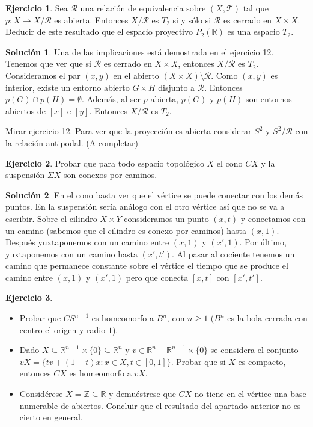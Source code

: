 \documentclass{article}
\theoremstyle{plain}
\theoremstyle{definition}
\newtheorem{exercise}{Ejercicio}
\newtheorem*{sol*}{Solución}
\begin{document}
\newpage
\begin{exercise}
Sea $\mathcal{R}$ una relación de equivalencia sobre $(X, \mathcal{T})$ tal que $p : X \to X/\mathcal{R}$ es abierta. Entonces $X/\mathcal{R}$ es $T_2$ si y sólo si $\mathcal{R}$ es cerrado en $X \times X$. Deducir de este resultado que el espacio proyectivo $P_2(\mathbb{R})$ es una espacio $T_2$.
\end{exercise}
\begin{sol*}
Una de las implicaciones está demostrada en el ejercicio 12. Tenemos que ver que si $\mathcal{R}$ es cerrado en $X \times X$, entonces $X / \mathcal{R}$ es $T_2$. Consideramos el par $(x,y)$ en el abierto $(X \times X) \setminus \mathcal{R}$. Como $(x,y)$ es interior, existe un entorno abierto $G \times H$ disjunto a $\mathcal{R}$. Entonces $p(G) \cap p(H) = \emptyset$. Además, al ser $p$ abierta, $p(G)$ y $p(H)$ son entornos abiertos de $[x]$ e $[y]$. Entonces $X/\mathcal{R}$ es $T_2$.  

Mirar ejercicio 12. Para ver que la proyección es abierta considerar $S^2$ y $S^2/\mathcal{R}$ con la relación antipodal. (A completar)
\end{sol*}


\newpage
\begin{exercise}
Probar que para todo espacio topológico $X$ el cono $C X$ y la suspensión $\Sigma X$ son conexos por caminos.
\end{exercise}
\begin{sol*}
En el cono basta ver que el vértice se puede conectar con los demás puntos. En la suspensión sería análogo con el otro vértice así que no se va a escribir. Sobre el cilindro $X\times Y$ consideramos un punto $(x,t)$ y conectamos con un camino (sabemos que el cilindro es conexo por caminos) hasta $(x,1)$. Después yuxtaponemos con un camino entre $(x,1)$ y $(x',1)$. Por último, yuxtaponemos con un camino hasta $(x',t')$. Al pasar al cociente tenemos un camino que permanece constante sobre el vértice el tiempo que se produce el camino entre $(x,1)$ y $(x',1)$ pero que conecta $[x,t]$ con $[x',t']$.
\end{sol*}

\newpage
\begin{exercise}
\begin{itemize}
	\item Probar que $C S^{n-1}$ es homeomorfo a $B^n$, con $n \geq 1$ ($B^n$ es la bola cerrada con centro el origen y radio $1$).
	\item Dado $X \subseteq \mathbb{R}^{n-1} \times \{0\} \subseteq \mathbb{R}^n$ y $v \in \mathbb{R}^n-\mathbb{R}^{n-1} \times \{0\}$ se considera el conjunto $vX = \{ tv + (1-t)x : x \in X, t \in [0,1]\}$. Probar que si $X$ es compacto, entonces $C X$ es homeomorfo a $vX$.
	\item Considérese $X = \mathbb{Z} \subseteq \mathbb{R}$ y demuéstrese que $C X$ no tiene en el vértice una base numerable de abiertos. Concluir que el resultado del apartado anterior no es cierto en general.
\end{itemize}
\end{exercise}
\end{document}
